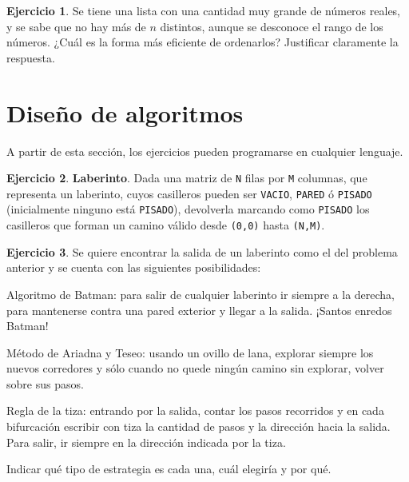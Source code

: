 \documentclass[11pt,a4paper]{article}
\theoremstyle{definition}
\newtheorem{ejercicio}{Ejercicio}[section]
\begin{document}
\begin{ejercicio}
Se tiene una lista con una cantidad muy grande de números reales, y se
sabe que no hay más de $n$ distintos, aunque se desconoce el rango de los
números. ¿Cuál es la forma más eficiente de ordenarlos? Justificar
claramente la respuesta.
\end{ejercicio}



\newpage
\section{Diseño de algoritmos}

A partir de esta sección, los ejercicios pueden programarse en cualquier lenguaje.

\begin{ejercicio}
\textbf{Laberinto}.
Dada una matriz de \lstinline!N! filas por \lstinline!M! columnas, que
representa un laberinto, cuyos casilleros pueden ser \lstinline!VACIO!,
\lstinline!PARED! ó \lstinline!PISADO! (inicialmente ninguno está
\lstinline!PISADO!), devolverla marcando como \lstinline!PISADO! los
casilleros que forman un camino válido desde \lstinline!(0,0)!  hasta
\lstinline!(N,M)!.
\end{ejercicio}

\begin{ejercicio}
Se quiere encontrar la salida de un laberinto como el del problema anterior y se cuenta con las
siguientes posibilidades:
\begin{partes}
\item Algoritmo de Batman: para salir de cualquier laberinto ir siempre a la
derecha, para mantenerse contra una pared exterior y llegar a la salida.
¡Santos enredos Batman!
\item Método de Ariadna y Teseo: usando un ovillo de lana, explorar siempre
los nuevos corredores y sólo cuando no quede ningún camino sin explorar,
volver sobre sus pasos.
\item Regla de la tiza: entrando por la salida, contar los pasos recorridos y
en cada bifurcación escribir con tiza la cantidad de pasos y la dirección
hacia la salida. Para salir, ir siempre en la dirección indicada por la
tiza.
\end{partes}
Indicar qué tipo de estrategia es cada una, cuál elegiría y por qué.
\end{ejercicio}
\end{document}
